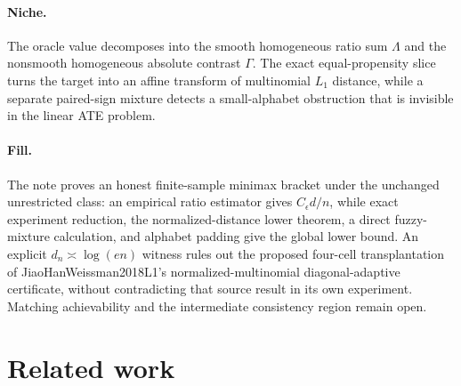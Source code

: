 \documentclass{article}
\begin{document}
\paragraph{Niche.} The oracle value decomposes into the smooth homogeneous ratio sum \(\Lambda\) and the nonsmooth homogeneous absolute contrast \(\Gamma\). The exact equal-propensity slice turns the target into an affine transform of multinomial \(L_1\) distance, while a separate paired-sign mixture detects a small-alphabet obstruction that is invisible in the linear ATE problem.

\paragraph{Fill.} The note proves an honest finite-sample minimax bracket under the unchanged unrestricted class: an empirical ratio estimator gives \(C_\epsilon d/n\), while exact experiment reduction, the normalized-distance lower theorem, a direct fuzzy-mixture calculation, and alphabet padding give the global lower bound. An explicit \(d_n\asymp\log(en)\) witness rules out the proposed four-cell transplantation of JiaoHanWeissman2018L1's normalized-multinomial diagonal-adaptive certificate, without contradicting that source result in its own experiment. Matching achievability and the intermediate consistency region remain open.

\section{Related work}
\end{document}
